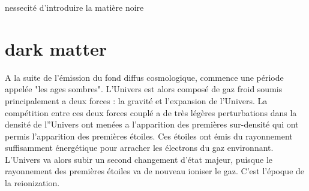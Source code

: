nessecité d'introduire la matière noire

\section{dark matter}







A la suite de l'émission du fond diffus cosmologique, commence une période appelée "les ages sombres".
L'Univers est alors composé de gaz froid soumis principalement a deux forces : la gravité et l'expansion de l'Univers.
La compétition entre ces deux forces couplé a de très légères perturbations dans la densité de l''Univers ont menées a l'apparition des premières sur-densité qui ont permis l'apparition des premières étoiles.
Ces étoiles ont émis du rayonnement suffisamment énergétique pour arracher les électrons du gaz environnant.
L'Univers va alors subir un second changement d'état majeur, puisque le rayonnement des premières étoiles va de nouveau ioniser le gaz.
C'est l'époque de la reionization.





